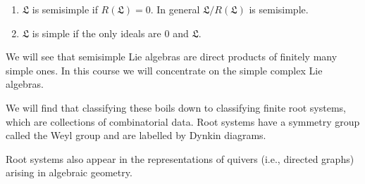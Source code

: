 \begin{enumerate}[label=(\alph*)]
	\item $\mathfrak{L}$ is semisimple if $R(\mathfrak{L}) = 0$. In general
		$\mathfrak{L}/R(\mathfrak{L})$ is semisimple.
	\item $\mathfrak{L}$ is simple if the only ideals are $0$ and $\mathfrak{L}$.
\end{enumerate}

We will see that semisimple Lie algebras are direct products of finitely many
simple ones. In this course we will concentrate on the simple complex Lie
algebras.

We will find that classifying these boils down to classifying finite root systems,
which are collections of combinatorial data. Root systems have a symmetry group
called the Weyl group and are labelled by Dynkin diagrams.

Root systems also appear in the representations of quivers (i.e., directed graphs)
arising in algebraic geometry.
